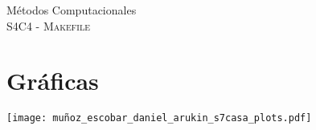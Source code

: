 \documentclass[11pt,letterpaper]{article}
\begin{document}
\begin{center}
{\Large Métodos Computacionales} \\
S4C4 - \textsc{Makefile}\\
\end{center}


\noindent
\section{Gr\'aficas}
\begin{center}
\texttt{[image: muñoz\_escobar\_daniel\_arukin\_s7casa\_plots.pdf]} 
\end{center}
\end{document}
